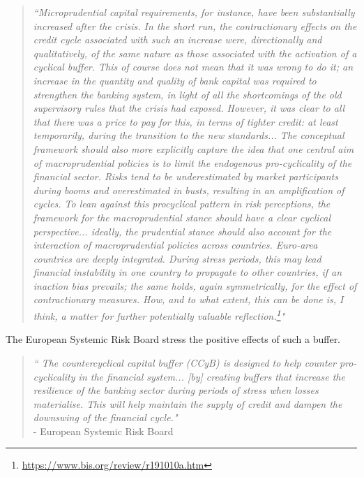 \documentclass[11pt]{article}
\begin{document}
\begin{quote}\textit{``Microprudential capital requirements, for instance, have been substantially increased after the crisis. In the short run, the contractionary effects on the credit cycle associated with such an increase were, directionally and qualitatively, of the same nature as those associated with the activation of a cyclical buffer. This of course does not mean that it was wrong to do it; an increase in the quantity and quality of bank capital was required to strengthen the banking system, in light of all the shortcomings of the old supervisory rules that the crisis had exposed. However, it was clear to all that there was a price to pay for this, in terms of tighter credit: at least temporarily, during the transition to the new standards... The conceptual framework should also more explicitly capture the idea that one central aim of macroprudential policies is to limit the endogenous pro-cyclicality of the financial sector. Risks tend to be underestimated by market participants during booms and overestimated in busts, resulting in an amplification of cycles. To lean against this procyclical pattern in risk perceptions, the framework for the macroprudential stance should have a clear cyclical perspective... ideally, the prudential stance should also account for the interaction of macroprudential policies across countries. Euro-area countries are deeply integrated. During stress periods, this may lead financial instability in one country to propagate to other countries, if an inaction bias prevails; the same holds, again symmetrically, for the effect of contractionary measures. How, and to what extent, this can be done is, I think, a matter for further potentially valuable reflection.\footnote{\url{https://www.bis.org/review/r191010a.htm}}"}
\end{quote}


The European Systemic Risk Board stress the positive effects of such a buffer.

\begin{quote}\textit{``
The countercyclical capital buffer (CCyB) is designed to help counter pro-cyclicality in the financial system... [by] creating buffers that increase the resilience of the banking sector during periods of stress when losses materialise. This will help maintain the supply of credit and dampen the downswing of the financial cycle."}\\
\hspace{1em}- {European Systemic Risk Board}
\end{quote}
\end{document}
